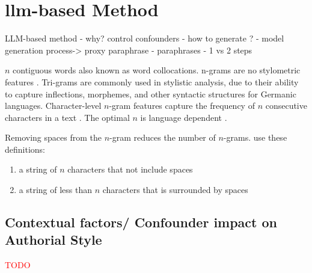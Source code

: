 \chapter{\acs{llm}-based \imp{} Method}
\label{chap:llm_impostor_method}
    LLM-based \imp{} method
    - why? control confounders
    - how to generate \imps{}? 
        - model generation process-> proxy paraphrase
        - paraphrases
        - 1 vs 2 steps


  \begin{definition}
    [n-gram]
    $n$ contiguous words also known as word collocations. 
    n-grams are no stylometric features \citep{altakrori_topic_2021}.
    Tri-grams are commonly used in stylistic analysis, due to their ability to capture inflections, %
    morphemes, %
    and other syntactic structures for Germanic languages.
    Character-level $n$-gram features capture the frequency of $n$ consecutive characters in a text \citep{neal_surveying_2018}.
    The optimal $n$ is language dependent \citep{neal_surveying_2018}.
\end{definition}

\begin{definition}
    Removing spaces from the $n$-gram reduces the number of $n$-grams.
    \citet{koppel_authorship_2011} use these definitions:
    \begin{enumerate}
        \item a string of $n$ characters that not include spaces
        \item a string of less than $n$ characters that is surrounded by spaces
    \end{enumerate}
\end{definition}

\section{Contextual factors/ Confounder impact on Authorial Style}
\label{sec:contextual_factors}
\textcolor{red}{TODO}



